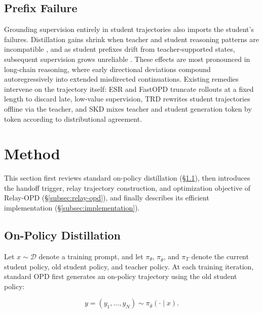 \documentclass{article} %
\begin{document}
\subsection{Prefix Failure}\label{subsec:prefix-failure}

Grounding supervision entirely in student trajectories also imports the student's failures. Distillation gains shrink when teacher and student reasoning patterns are incompatible \citep{li2026rethinking}, and as student prefixes drift from teacher-supported states, subsequent supervision grows unreliable \citep{fu2026revisiting,xie2026position}. These effects are most pronounced in long-chain reasoning, where early directional deviations compound autoregressively into extended misdirected continuations. Existing remedies intervene on the trajectory itself: ESR and FastOPD \citep{ziheng2026less,zhang2026fast} truncate rollouts at a fixed length to discard late, low-value supervision, TRD \citep{jiang2026trajectory} rewrites student trajectories offline via the teacher, and SKD \citep{xu2025speculative} mixes teacher and student generation token by token according to distributional agreement.\par

\section{Method}\label{sec:method}

This section first reviews standard on-policy distillation (\S\ref{subsec:opd}), then introduces the handoff trigger, relay trajectory construction, and optimization objective of Relay-OPD (\S\ref{subsec:relay-opd}), and finally describes its efficient implementation (\S\ref{subsec:implementation}).\par

\subsection{On-Policy Distillation}\label{subsec:opd}

Let $x\sim\mathcal D$ denote a training prompt, and let $\pi_\theta$, $\pi_{\bar\theta}$, and $\pi_T$ denote the current student policy, old student policy, and teacher policy. At each training iteration, standard OPD first generates an on-policy trajectory using the old student policy:\par

\begin{equation}
y=(y_1,\ldots,y_N)\sim\pi_{\bar\theta}(\cdot\mid x).
\end{equation}
\end{document}
